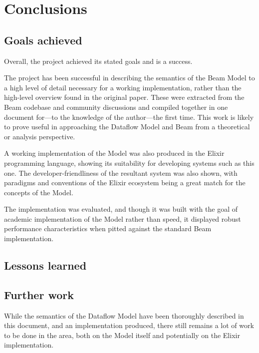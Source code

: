 \chapter{Conclusions}\label{ch:concl}
\section{Goals achieved}\label{sec:concl:goals}


Overall, the project achieved its stated goals and is a success.

The project has been successful in describing the semantics of the Beam Model to a high level of detail necessary for a working implementation, rather than the high-level overview found in the original paper.
These were extracted from the Beam codebase and community discussions and compiled together in one document for---to the knowledge of the author---the first time.
This work is likely to prove useful in approaching the Dataflow Model and Beam from a theoretical or analysis perspective.

A working implementation of the Model was also produced in the Elixir programming language, showing its suitability for developing systems such as this one.
The developer-friendliness of the resultant system was also shown, with paradigms and conventions of the Elixir ecosystem being a great match for the concepts of the Model.

The implementation was evaluated, and though it was built with the goal of academic implementation of the Model rather than speed, it displayed robust performance characteristics when pitted against the standard Beam implementation.

\section{Lessons learned}\label{sec:concl:lessons}
\section{Further work}\label{sec:concl:further}

While the semantics of the Dataflow Model have been thoroughly described in this document, and an implementation produced, there still remains a lot of work to be done in the area, both on the Model itself and potentially on the Elixir implementation.

